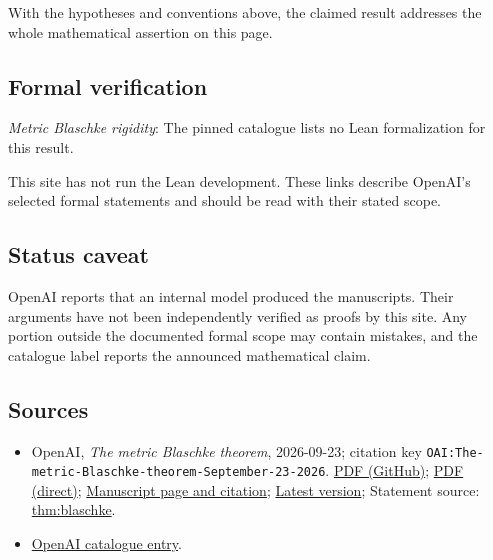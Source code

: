 \documentclass[11pt]{article}
\begin{document}
With the hypotheses and conventions above, the claimed result addresses the whole mathematical assertion on this page.

\subsection{Formal verification}
\textit{Metric Blaschke rigidity}: The pinned catalogue lists no Lean formalization for this result.

This site has not run the Lean development. These links describe OpenAI’s selected formal statements and should be read with their stated scope.

\subsection{Status caveat}
OpenAI reports that an internal model produced the manuscripts. Their arguments have not been independently verified as proofs by this site. Any portion outside the documented formal scope may contain mistakes, and the catalogue label reports the announced mathematical claim.

\subsection{Sources}
\begin{itemize}
\item OpenAI, \emph{The metric Blaschke theorem}, 2026-09-23; citation key \texttt{OAI:The-metric-Blaschke-theorem-September-23-2026}. \href{https://github.com/openai/math/blob/adc7f1241b42e322a6451854ab7e4b4c146bf78a/preprints/The-metric-Blaschke-theorem-September-23-2026/paper.pdf}{PDF (GitHub)}; \href{https://github.com/openai/math/raw/adc7f1241b42e322a6451854ab7e4b4c146bf78a/preprints/The-metric-Blaschke-theorem-September-23-2026/paper.pdf}{PDF (direct)}; \href{https://github.com/openai/math/blob/adc7f1241b42e322a6451854ab7e4b4c146bf78a/preprints/The-metric-Blaschke-theorem-September-23-2026/README.md}{Manuscript page and citation}; \href{https://github.com/openai/math/blob/main/preprints/The-metric-Blaschke-theorem-September-23-2026/paper.pdf}{Latest version}; Statement source: \href{https://github.com/openai/math/blob/adc7f1241b42e322a6451854ab7e4b4c146bf78a/preprints/The-metric-Blaschke-theorem-September-23-2026/build/sections/00-introduction.tex\#L31}{thm:blaschke}.
\item \href{https://github.com/openai/math/blob/adc7f1241b42e322a6451854ab7e4b4c146bf78a/CONTENTS.md}{OpenAI catalogue entry}.
\end{itemize}
\end{document}
